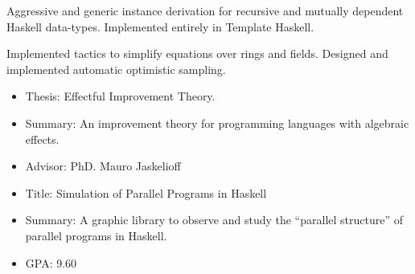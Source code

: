     Aggressive and generic instance derivation for recursive and mutually
dependent Haskell data-types.
    Implemented entirely in Template Haskell.

    \divider
    Implemented tactics to simplify equations over rings and fields.
    Designed and implemented automatic optimistic sampling.

    \begin{itemize}
        \item Thesis: Effectful Improvement Theory.
        \item Summary: An improvement theory for programming languages with
                algebraic effects.
        \item Advisor: PhD. Mauro Jaskelioff
    \end{itemize}
    \divider

    \begin{itemize}
        \item Title: Simulation of Parallel Programs in Haskell
        \item Summary: A graphic library to observe and study the ``parallel
                structure'' of parallel programs in Haskell.
        \item GPA: 9.60
    \end{itemize}

